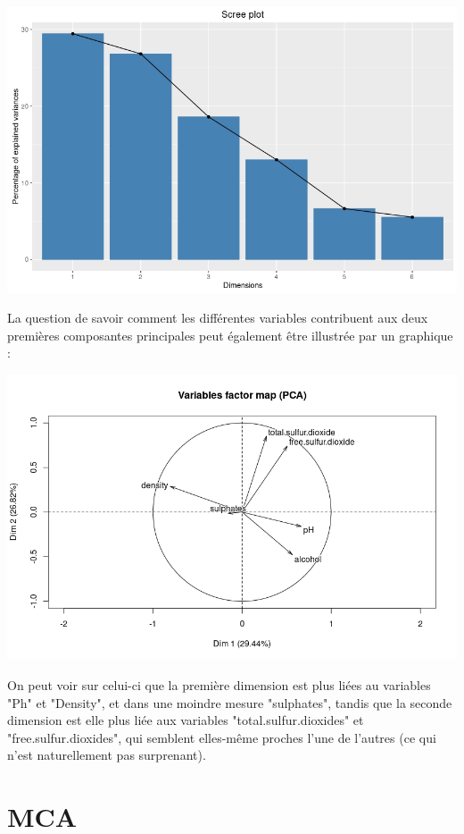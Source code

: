 \documentclass[11pt,a4paper]{article}
\begin{document}
\begin{center}
\includegraphics[scale=0.4]{"screeplot"}
\end{center}

La question de savoir comment les différentes variables contribuent aux deux premières composantes principales peut également être illustrée par un graphique :

\begin{center}
\includegraphics[scale=0.5]{"factormap"}
\end{center}

On peut voir sur celui-ci que la première dimension est plus liées au variables "Ph" et "Density", et dans une moindre mesure "sulphates", tandis que la seconde dimension est elle plus liée aux variables "total.sulfur.dioxides" et "free.sulfur.dioxides", qui semblent elles-même proches l'une de l'autres (ce qui n'est naturellement pas surprenant).


\section{MCA}
\end{document}
